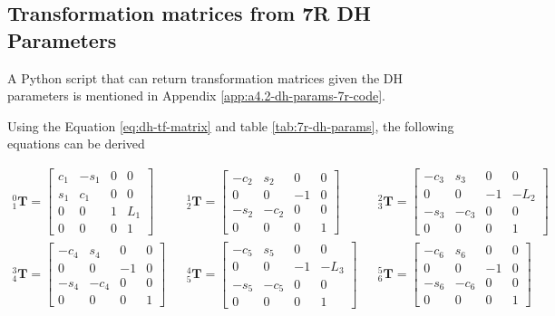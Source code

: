 \subsection[A4.2: Transformations]{Transformation matrices from 7R DH Parameters}

A Python script that can return transformation matrices given the DH parameters is mentioned in Appendix \ref{app:a4.2-dh-params-7r-code}.

Using the Equation \ref{eq:dh-tf-matrix} and table \ref{tab:7r-dh-params}, the following equations can be derived

\begin{align}
    _{1}^{0}\mathbf{T} = \left[\begin{matrix}c_{1} & - s_{1} & 0 & 0\\s_{1} & c_{1} & 0 & 0\\0 & 0 & 1 & L_{1}\\0 & 0 & 0 & 1\end{matrix}\right]
    &&
    _{2}^{1}\mathbf{T} = \left[\begin{matrix}- c_{2} & s_{2} & 0 & 0\\0 & 0 & -1 & 0\\- s_{2} & - c_{2} & 0 & 0\\0 & 0 & 0 & 1\end{matrix}\right]
    &&
    _{3}^{2}\mathbf{T} = \left[\begin{matrix}- c_{3} & s_{3} & 0 & 0\\0 & 0 & -1 & - L_{2}\\- s_{3} & - c_{3} & 0 & 0\\0 & 0 & 0 & 1\end{matrix}\right]
    \\
    _{4}^{3}\mathbf{T} = \left[\begin{matrix}- c_{4} & s_{4} & 0 & 0\\0 & 0 & -1 & 0\\- s_{4} & - c_{4} & 0 & 0\\0 & 0 & 0 & 1\end{matrix}\right]
    &&
    _{5}^{4}\mathbf{T} = \left[\begin{matrix}- c_{5} & s_{5} & 0 & 0\\0 & 0 & -1 & - L_{3}\\- s_{5} & - c_{5} & 0 & 0\\0 & 0 & 0 & 1\end{matrix}\right]
    &&
    _{6}^{5}\mathbf{T} = \left[\begin{matrix}- c_{6} & s_{6} & 0 & 0\\0 & 0 & -1 & 0\\- s_{6} & - c_{6} & 0 & 0\\0 & 0 & 0 & 1\end{matrix}\right]

\end{align}
